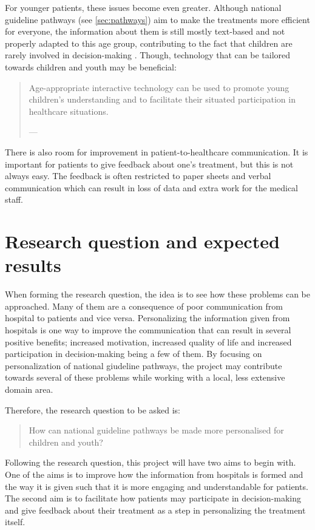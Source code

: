 For younger patients, these issues become even greater. Although national guideline pathways (see \autoref{sec:pathways}) aim to make the treatments more efficient for everyone, the information about them is still mostly text-based and not properly adapted to this age group, contributing to the fact that children are rarely involved in decision-making \parencite{coyne2008}. Though, technology that can be tailored towards children and youth may be beneficial:

\begin{quote}
    Age-appropriate interactive technology can be used to promote young children’s understanding and to facilitate their situated participation in healthcare situations.

    \raggedleft--- \textcite{stalberg2018}
\end{quote}

There is also room for improvement in patient-to-healthcare communication. It is important for patients to give feedback about one's treatment, but this is not always easy. The feedback is often restricted to paper sheets and verbal communication which can result in loss of data and extra work for the medical staff.

\section{Research question and expected results}
\label{sec:researchquestion}

When forming the research question, the idea is to see how these problems can be approached. Many of them are a consequence of poor communication from hospital to patients and vice versa. Personalizing the information given from hospitals is one way to improve the communication that can result in several positive benefits; increased motivation, increased quality of life and increased participation in decision-making being a few of them. By focusing on personalization of national giudeline pathways, the project may contribute towards several of these problems while working with a local, less extensive domain area.

Therefore, the research question to be asked is:

\begin{quote}
    How can national guideline pathways be made more personalised for children and youth?
\end{quote}

Following the research question, this project will have two aims to begin with. One of the aims is to improve how the information from hospitals is formed and the way it is given such that it is more engaging and understandable for patients. The second aim is to facilitate how patients may participate in decision-making and give feedback about their treatment as a step in personalizing the treatment itself.

